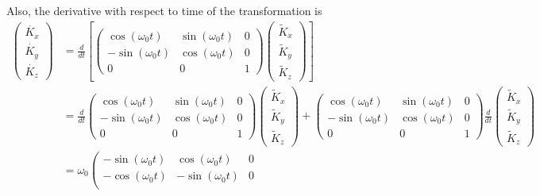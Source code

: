 \documentclass{article}
\begin{document}
Also, the derivative with respect to time of the transformation is
\begin{align}
    \left(\begin{array}{c}
        \dot{K_{x}}\\
        \dot{K_{y}}\\
        \dot{K_{z}}
    \end{array}\right)	&=\frac{d}{dt}\left[\left(\begin{array}{ccc}
        \cos(\omega_{0}t) & \sin(\omega_{0}t) & 0\\
        -\sin(\omega_{0}t) & \cos(\omega_{0}t) & 0\\
        0 & 0 & 1
    \end{array}\right)\left(\begin{array}{c}
        \tilde{K}_{x}\\
        \tilde{K}_{y}\\
        \tilde{K}_{z}
    \end{array}\right)\right]\\ 
    &=\frac{d}{dt}\left(\begin{array}{ccc}
        \cos(\omega_{0}t) & \sin(\omega_{0}t) & 0\\
        -\sin(\omega_{0}t) & \cos(\omega_{0}t) & 0\\
        0 & 0 & 1
    \end{array}\right)\left(\begin{array}{c}
        \tilde{K}_{x}\\
        \tilde{K}_{y}\\
        \tilde{K}_{z}
    \end{array}\right) + 
    \left(\begin{array}{ccc}
        \cos(\omega_{0}t) & \sin(\omega_{0}t) & 0\\
        -\sin(\omega_{0}t) & \cos(\omega_{0}t) & 0\\
        0 & 0 & 1
    \end{array}\right)
    \frac{d}{dt}\left(\begin{array}{c}
        \tilde{K}_{x}\\
        \tilde{K}_{y}\\
        \tilde{K}_{z}
    \end{array}\right)\\
    &=\omega_{0}\left(\begin{array}{ccc}
        -\sin(\omega_{0}t) & \cos(\omega_{0}t) & 0\\
        -\cos(\omega_{0}t) & -\sin(\omega_{0}t) & 0\\

\end{array}
\end{align}
\end{document}
